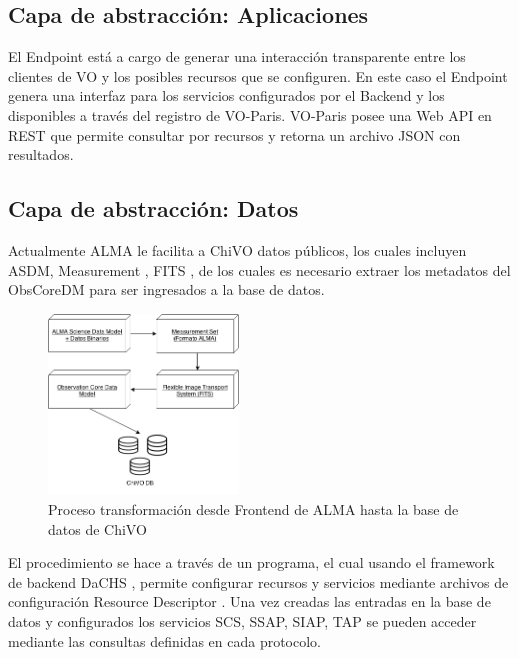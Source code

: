 \subsection{Capa de abstracción: Aplicaciones}

El Endpoint está a cargo de generar una interacción transparente entre los clientes
de VO y los posibles recursos que se configuren.
En este caso el Endpoint genera una interfaz para los servicios configurados por el
Backend y los disponibles a través del registro de VO-Paris.
VO-Paris posee una Web API en REST que permite consultar por recursos y retorna un
archivo JSON con resultados.

\subsection{Capa de abstracción: Datos}

Actualmente ALMA le facilita a ChiVO datos públicos, los cuales incluyen ASDM,
Measurement \cite{petry2012analysing}, FITS \cite{wells1981fits}, de los cuales es
necesario extraer los metadatos del ObsCoreDM para ser ingresados a la base de datos.

\begin{figure}[h!t]
    \centering
    \includegraphics[width=0.45\textwidth]{images/metadata.png}
    \caption{Proceso transformación desde Frontend de ALMA hasta la base de datos
             de ChiVO}
    \label{fig:metadata}
\end{figure}

El procedimiento se hace a través de un programa, el cual usando el framework de
backend DaCHS \cite{dachs}, permite configurar recursos y servicios mediante
archivos de configuración Resource Descriptor \cite{dachsorguide}.
Una vez creadas las entradas en la base de datos y configurados los servicios SCS,
SSAP, SIAP, TAP se pueden acceder mediante las consultas definidas en cada
protocolo.


